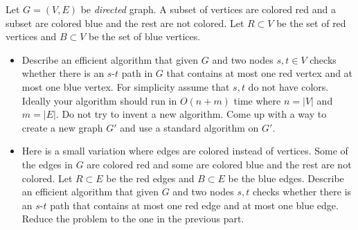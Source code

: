 \documentclass[11pt]{article}
\begin{document}

\item Let $G=(V,E)$ be \emph{directed} graph. A subset of vertices are colored
  red and a subset are colored blue and the rest are not colored.  Let
  $R \subset V$ be the set of red vertices and $B \subset V$ be the set
  of blue vertices.
  \begin{itemize}
  \item Describe an efficient algorithm that given $G$ and
  two nodes $s,t \in V$ checks whether there is an $s$-$t$ path in $G$
  that contains at most one red vertex and at most one blue
  vertex. For simplicity assume that $s,t$ do not have colors. Ideally
  your algorithm should run in $O(n+m)$ time where $n = |V|$ and $m = |E|$.
  Do not try to invent a new algorithm. Come up with a way to create
  a new graph $G'$ and use a standard algorithm on $G'$.
\item Here is a small variation where edges are colored instead of
  vertices.  Some of the edges in $G$ are colored red and some are
  colored blue and the rest are not colored. Let $R \subset E$ be the
  red edges and $B \subset E$ be the blue edges. Describe an efficient
  algorithm that given $G$ and two nodes $s,t$ checks whether there is
  an $s$-$t$ path that contains at most one red edge and at most one
  blue edge. Reduce the problem to the one in the previous part.
  \end{itemize}
\end{document}
